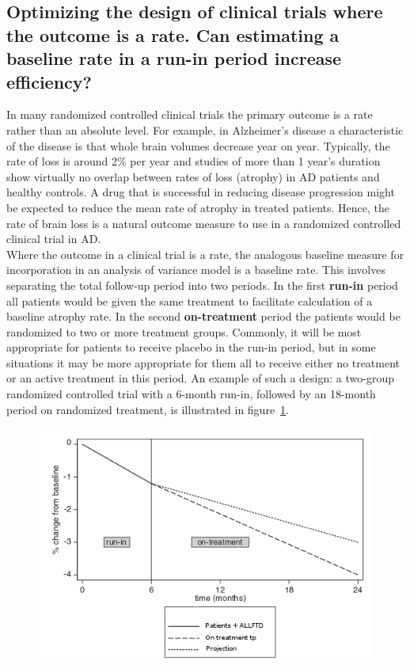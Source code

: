 \documentclass[final, paper=letter,5p,times,twocolumn]{elsarticle}
\theoremstyle{definition}
\begin{document}
\subsection{Optimizing the design of clinical trials where the outcome is a rate. Can estimating a baseline rate in a run-in period increase efficiency?}

In many randomized controlled clinical trials the primary outcome is a rate rather than an absolute level. For example, in Alzheimer's disease a characteristic of the disease is that whole brain volumes decrease year on year. Typically, the rate of loss is around 2\% per year and studies of more than 1 year's duration show virtually no overlap between rates of loss (atrophy) in AD patients and healthy controls. A drug that is successful in reducing disease progression might be expected to reduce the mean rate of atrophy in treated patients. Hence, the rate of brain loss is a natural outcome measure to use in a randomized controlled clinical trial in AD.\\
Where the outcome in a clinical trial is a rate, the analogous baseline measure for incorporation in an analysis of variance model is a baseline rate. This involves separating the total follow-up period into two periods. In the first {\bf run-in} period all patients would be given the same treatment to facilitate calculation of a baseline atrophy rate. In the second {\bf on-treatment} period the patients would be randomized to two or more treatment groups. Commonly, it will be most appropriate for patients to receive placebo in the run-in period, but in some situations it may be more appropriate for them all to receive either no treatment or an active treatment in this period. An example of such a design: a two-group randomized controlled trial with a 6-month run-in, followed by an 18-month period on randomized treatment, is illustrated in figure~\ref{fig:Run_in}.

\begin{figure}[h]
  \includegraphics[scale=0.5, angle=0]{images/Run-in_run.png}
  \label{fig:Run_in}
\end{figure}
\end{document}
